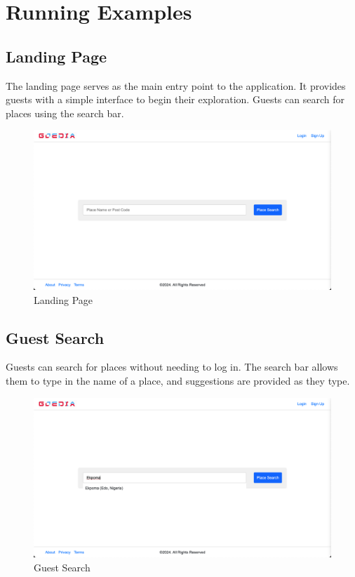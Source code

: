 \chapter{Running Examples}

\section{Landing Page}
The landing page serves as the main entry point to the application. It provides guests with a simple interface to begin their exploration. Guests can search for places using the search bar.

\begin{figure}[H]
    \centering
    \includegraphics[width=\textwidth]{landingPage.png}
    \caption{Landing Page}
    \label{fig:landingPage}
\end{figure}

\section{Guest Search}
Guests can search for places without needing to log in. The search bar allows them to type in the name of a place, and suggestions are provided as they type.

\begin{figure}[H]
    \centering
    \includegraphics[width=\textwidth]{guestSearch.png}
    \caption{Guest Search}
    \label{fig:guestSearch}
\end{figure}

